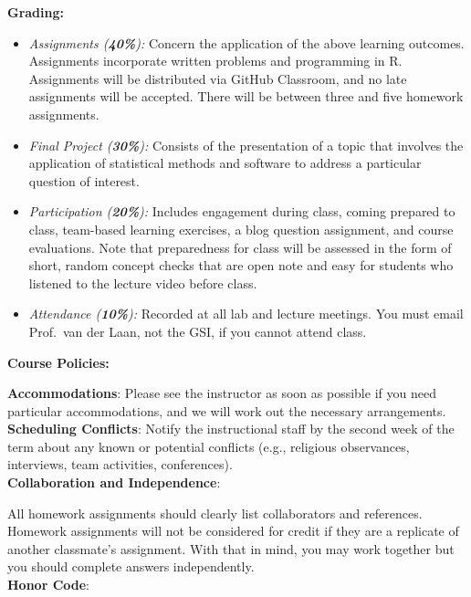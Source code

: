 \documentclass[11pt]{article}
\begin{document}
\textbf {\large Grading:} \\
\begin{itemize}
  \item \textit{Assignments (\textbf{40\%}):} Concern the application of the
    above learning outcomes. Assignments incorporate written problems and
    programming in R. Assignments will be distributed via GitHub Classroom, and
    no late assignments will be accepted. There will be between three and five
    homework assignments.
  \item \textit{Final Project (\textbf{30\%}):} Consists of the presentation of
    a topic that involves the application of statistical methods and software to
    address a particular question of interest.
  \item \textit{Participation (\textbf{20\%}):} Includes engagement during
    class, coming prepared to class, team-based learning exercises, a blog
    question assignment, and course evaluations. Note that preparedness for
    class will be assessed in the form of short, random concept checks that are
    open note and easy for students who listened to the lecture video before
    class.
  \item \textit{Attendance (\textbf{10\%}):} Recorded at all lab and lecture
    meetings. You must email Prof.~van der Laan, not the GSI, if you cannot
    attend class. \\
\end{itemize}

\textbf{\large Course Policies:}

\textbf{Accommodations}:
Please see the instructor as soon as possible if you need particular
accommodations, and we will work out the necessary arrangements. \\

\textbf{Scheduling Conflicts}:
Notify the instructional staff by the second week of the term about any known or
potential conflicts (e.g., religious observances, interviews, team activities,
conferences). \\

\textbf{Collaboration and Independence}:

All homework assignments should clearly list collaborators and references.
Homework assignments will not be considered for credit if they are a replicate
of another classmate's assignment. With that in mind, you may work together but
you should complete answers independently. \\

\textbf{Honor Code}:
\end{document}
